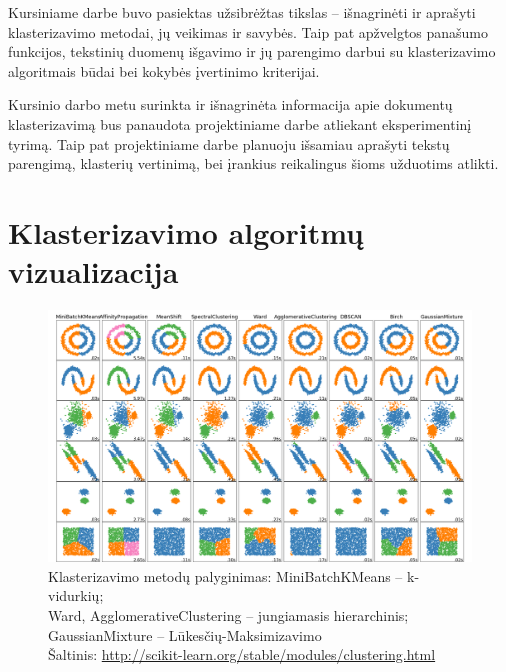 \documentclass{VUMIFInfKursinis}
\begin{document}

Kursiniame darbe buvo pasiektas užsibrėžtas tikslas – išnagrinėti ir
aprašyti klasterizavimo metodai, jų veikimas ir savybės. Taip pat
apžvelgtos panašumo funkcijos, tekstinių duomenų išgavimo ir jų
parengimo darbui su klasterizavimo algoritmais būdai bei kokybės
įvertinimo kriterijai.

Kursinio darbo metu surinkta ir išnagrinėta informacija apie dokumentų
klasterizavimą bus panaudota projektiniame darbe atliekant
eksperimentinį tyrimą. Taip pat projektiniame darbe planuoju išsamiau
aprašyti tekstų parengimą, klasterių vertinimą, bei įrankius reikalingus
šioms užduotims atlikti.






\printbibliography[heading=bibintoc] %

\appendix  %

\section{Klasterizavimo algoritmų vizualizacija}
\begin{figure}[!ht]
  \centering
  \includegraphics[scale=.3]{img/ClusterPlot}
  \caption{Klasterizavimo metodų palyginimas: MiniBatchKMeans – k-vidurkių;\\
   Ward, AgglomerativeClustering – jungiamasis hierarchinis; GaussianMixture – Lūkesčių-Maksimizavimo\\
   Šaltinis: \url{http://scikit-learn.org/stable/modules/clustering.html}}
  \label{clustAlg}
\end{figure}
\end{document}
